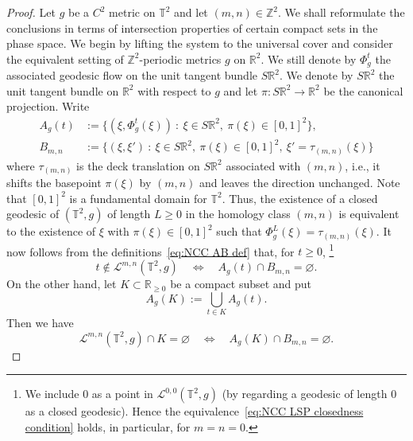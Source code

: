 \documentclass[11pt,letterpaper,oneside]{amsart}
\newcommand{\Z}{\mathbb{Z}}
\newcommand{\R}{\mathbb{R}}
\newcommand{\T}{\mathbb{T}}
\theoremstyle{definition}
\theoremstyle{remark}
\theoremstyle{definition}
\theoremstyle{remark}
\newcommand{\CL}{\mathcal{L}}
\begin{document}
\begin{proof}
    Let $g$ be a $C^2$ metric on $\T^2$ and let $(m,n) \in \Z^2$.
    We shall reformulate the conclusions in terms of intersection properties of certain compact sets in the phase space.
    We begin by lifting the system to the universal cover and consider the equivalent setting of $\Z^2$-periodic metrics $g$ on $\R^2$. We still denote by $\Phi_g^t$ the associated geodesic flow on the unit tangent bundle $S\R^2$.
    We denote by $S\R^2$ the unit tangent bundle on $\R^2$ with respect to $g$ and let $\pi: S\R^2 \to \R^2$ be the canonical projection.
    Write
	\begin{equation}\label{eq:NCC AB def}
    \begin{aligned}
		A_g(t) &:= \{(\xi, \Phi^t_g(\xi))\ : \ \xi \in S\R^2,\ \pi(\xi) \in [0,1]^2\}, \\ 
        B_{m,n} &:= \{(\xi, \xi') \ : \ \xi \in S\R^2,\ \pi(\xi) \in [0,1]^2, \ \xi' = \tau_{(m,n)} (\xi)\}
    \end{aligned}
	\end{equation}
    where $\tau_{(m,n)}$ is the deck translation on $S\R^2$ associated with $(m,n)$, i.e., it shifts the basepoint $\pi(\xi)$ by $(m,n)$ and leaves the direction unchanged.
    Note that $[0,1]^2$ is a fundamental domain for $\T^2$.
    Thus, the existence of a closed geodesic of $(\T^2, g)$ of length $L \geq 0$ in the homology class $(m,n)$ is equivalent to the existence of $\xi$ with $\pi (\xi) \in [0,1]^2$ such that $\Phi^L_g(\xi) = \tau_{(m,n)} (\xi)$.
    It now follows from the definitions~\eqref{eq:NCC AB def} that, for $t \geq 0$,
    \footnote{We include $0$ as a point in $\CL^{0,0}(\T^2, g)$ (by regarding a geodesic of length $0$ as a closed geodesic). Hence the equivalence~\eqref{eq:NCC LSP closedness condition} holds, in particular, for $m = n = 0$.}
    \begin{equation}\label{eq:NCC LSP closedness condition}
        t \notin \CL^{m,n}(\T^2, g) \quad \iff \quad  A_g(t) \cap B_{m,n} = \varnothing.
    \end{equation}
    On the other hand, let $K \subset \R_{\geq 0}$ be a compact subset and put 
    \begin{equation}
        A_g(K) := \bigcup_{t \in K} A_g(t).
    \end{equation}
    Then we have 
    \begin{equation}\label{eq:NCC LSP stability condition}
        \CL^{m,n}(\T^2, g) \cap K = \varnothing \quad  \iff  \quad A_g(K) \cap  B_{m,n} = \varnothing.
    \end{equation}

\end{proof}
\end{document}
